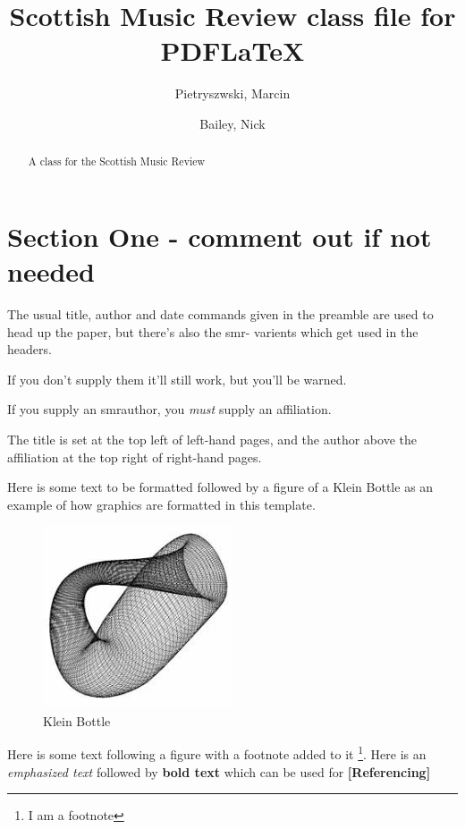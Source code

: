 \documentclass{SMR}
\title{Scottish Music Review class file for PDFLaTeX}
\author{Pietryszwski, Marcin \and Bailey, Nick}
\begin{document}
\maketitle

\begin{abstract}
A class for the Scottish Music Review
\end{abstract}

\section{Section One - comment out if not needed} %
The usual title, author and date commands given in the preamble
are used to head up the paper, but there's also the smr- varients
which get used in the headers.

If you don't supply them it'll still work, but you'll be warned.

If you supply an smrauthor, you \emph{must} supply an affiliation.

The title is set at the top left of left-hand pages, and the
author above the affiliation at the top right of right-hand pages.

\vspace*{1.0cm}

Here is some text to be formatted followed by a figure of
a Klein Bottle as an example of how graphics are formatted
in this template.

\begin{figure}[h]
\caption{Klein Bottle} %
\centering
\includegraphics[width=0.5\textwidth]{klein.jpg}
\end{figure}

Here is some text following a figure with a footnote added
to it \footnote{I am a footnote}. Here is an \emph{emphasized text}
followed by \textbf{bold text} which can be used for
\textbf{[Referencing]}
\end{document}
